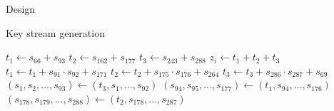 \documentclass[10pt, compress]{beamer}
\begin{document}
    \begin{frame}{Design}
        \begin{figure}
            
        \end{figure}
    \end{frame}

    \begin{frame}{Key stream generation}
        \begin{center}
            \begin{minipage}{\textwidth}
                \begin{algorithm}[H]
                    \begin{algorithmic}[1]
                         
                        \State $t_1 \gets s_{66} + s_{93}$
                        \State $t_2 \gets s_{162} + s_{177}$
                        \State $t_3 \gets s_{243} + s_{288}$
                        \State
                        \State $z_i \gets t_1 + t_2 + t_3$
                        \State
                        \State $t_1 \gets t_1 + s_{91} \cdot s_{92} + s_{171}$
                        \State $t_2 \gets t_2 + s_{175} \cdot s_{176} + s_{264}$
                        \State $t_3 \gets t_3 + s_{286} \cdot s_{287} + s_{69}$
                        \State
                        \State $(s_1,s_2,\dots,s_{93}) \gets (t_3,s_1,\dots,s_{92})$ 
                        \State $(s_{94},s_{95},\dots,s_{177}) \gets (t_1,s_{94},\dots,s_{176})$ 
                        \State $(s_{178},s_{179},\dots,s_{288}) \gets (t_2,s_{178},\dots,s_{287})$ 
                        \EndFor
                    \end{algorithmic}
                \end{algorithm}
            \end{minipage}
        \end{center}
    \end{frame}
\end{document}
